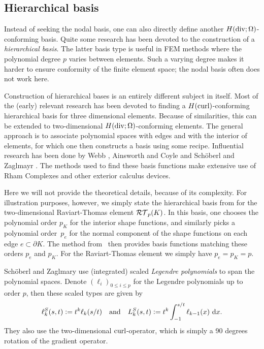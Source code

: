 \documentclass[thesis.tex]{subfiles}
\begin{document}
  \subsection{Hierarchical basis}
  Instead of seeking the nodal basis, one can also directly define another $H(\operatorname{div}; \Omega)$-conforming basis. Quite some research
  has been devoted  to the construction of  a \emph{hierarchical basis}. The latter basis type is useful in FEM methods where the
  polynomial degree $p$ varies between elements. Such a varying degree makes it harder to ensure conformity of the finite element space;
  the nodal basis often does not work here. 

  Construction of hierarchical bases is an entirely different subject in itself. Most of the (early) relevant research
  has been devoted to finding a $H(\operatorname{curl})$-conforming hierarchical basis for three dimensional elements. 
  Because of similarities, this can be extended to two-dimensional $H(\operatorname{div}; \Omega)$-conforming elements. The general approach is to
  associate polynomial spaces with edges and with the interior of elements, for which one then constructs a basis using some recipe.
  Influential research has been done by Webb \cite{webb}, Ainsworth and Coyle \cite{ainsworth2003hierarchic} and Sch\"oberl and Zaglmayr \cite{schoberl2005high}. 
  The methods used to find these basis functions make extensive use of Rham Complexes and other exterior calculus devices.
  
  Here we will not provide the theoretical details, because of its complexity.
  For illustration purposes, however, 
  we simply state the hierarchical basis from \cite{schoberl2005high} for the two-dimensional Raviart-Thomas element $\mathcal{RT}_p(K)$.
  In this basis, one chooses the polynomial order $p_K$ for the interior shape functions, and similarly 
  picks a polynomial order~$p_e$ for the normal component of the shape functions on each edge $e \subset \partial K$.
  The method from~\cite{schoberl2005high} then provides basis functions matching these orders $p_e$ and $p_K$.
  For the Raviart-Thomas element we simply have $p_e = p_K =  p$.

  Sch\"oberl and Zaglmary use (integrated) scaled \emph{Legendre polynomials} to span the polynomial spaces.
  Denote $(\ell_i)_{0 \leq i \leq p}$ for the Legendre polynomials up to order $p$, then these scaled types
  are given by
  \[
    \ell_k^S(s,t) := t^k \ell_k(s/t) \quad \text{and} \quad L_k^S(s,t) := t^k \int_{-1}^{s/t} \ell_{k-1}(x) \, \dif x.
  \]
  They also use the two-dimensional $\operatorname{curl}$-operator, which is simply a 90 degrees rotation of the gradient operator. 
  
\end{document}
